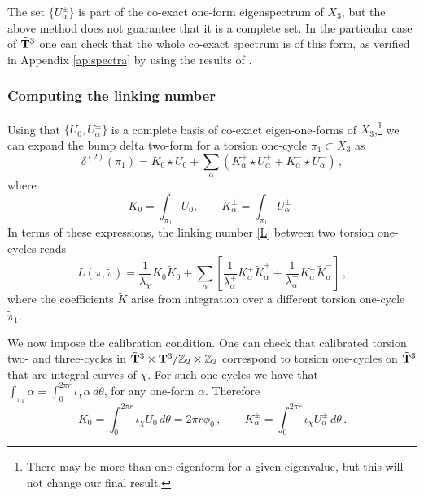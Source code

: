 \documentclass[11pt]{article}
\def\a {\alpha}
\def\be{\begin{equation}}
\def\ee{\end{equation}}
\def\th {{\theta}}
\newcommand{\IZ}{\mathbb{Z}}
\begin{document}
The set $\{U_\a^\pm\}$ is part of the co-exact one-form eigenspectrum of $X_3$, but the above method does not guarantee that it is a complete set. In the particular case of $\tilde{\bf T}^3$ one can check that the whole co-exact spectrum is of this form, as verified in Appendix \ref{ap:spectra} by using the results of  \cite{Andriot:2018tmb}.

\subsubsection*{Computing the linking number}

Using that $\{U_0, U_\a^\pm\}$ is a complete basis of co-exact eigen-one-forms of $X_3$,\footnote{There may be more than one eigenform for a given eigenvalue, but this will not change our final result.} we can expand the bump delta two-form for a torsion one-cycle $\pi_1 \subset X_3$ as
\begin{equation}
	\delta^{(2)}(\pi_1) = K_0 \star U_0 + \sum_\a \left( K_\a^+  \star U^+_\a + K_\a^-  \star U^-_\a \right)\, , \label{delta2sm}
\end{equation} 
where
\be
K_0 = \int_{\pi_1} U_0, \qquad K_\a^\pm = \int_{\pi_1} U_\a^\pm \, .
\ee
In terms of these expressions, the linking number \eqref{L} between two torsion one-cycles reads
\begin{equation}
	L(\pi, \tilde{\pi}) = \frac{1}{ \lambda_\chi} K_0 \tilde{K}_0 + \sum_\a \left[ \frac{1}{\lambda_\a^+} K^+_\a \tilde{K}^+_\a + \frac{1}{\lambda_\a^-} K^-_\a \tilde{K}^-_\a \right]\, ,
	\label{LtT3}
\end{equation}
where the coefficients $\tilde{K}$ arise from integration over a different torsion one-cycle  $\tilde{\pi}_1$. 

We now impose the calibration condition. One can check that calibrated torsion two- and three-cycles in $\tilde{\bf T}^3 \times {\bf T}^3/\IZ_2 \times \IZ_2$ correspond to torsion one-cycles on $\tilde{\bf T}^3$ that are integral curves of $\chi$. For such one-cycles we have that $\int_{\pi_1} \alpha = \int_0^{2\pi r} \iota_\chi \alpha\, d\th$, for any one-form $\a$. Therefore 
\be
K_0 =  \int_0^{2\pi r} 	\iota_\chi  U_0 \, d\th = 2\pi r \phi_0 \, , \qquad K_\a^\pm =   \int_0^{2\pi r} 	\iota_\chi  U_\a^\pm \, d\th  \, .
\ee
\end{document}
